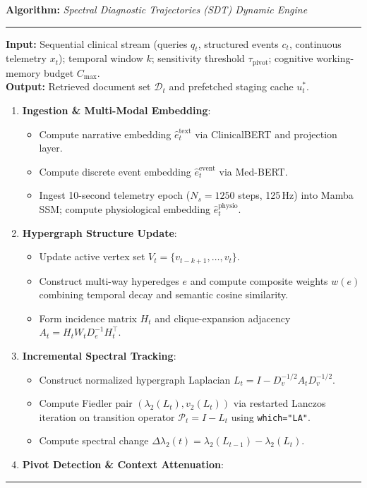 \documentclass[11pt]{article}
\newenvironment{pseudocode}[1]{%
  \begin{list}{}{\setlength{\leftmargin}{1em}\setlength{\itemsep}{1pt}}
  \item \textbf{Algorithm:} \textit{#1}
  \item \hrule \medskip
}{%
  \vspace{4pt}\hrule
  \end{list}
}
\begin{document}
\begin{pseudocode}{Spectral Diagnostic Trajectories (SDT) Dynamic Engine}
\textbf{Input:} Sequential clinical stream (queries $q_t$, structured events $c_t$, continuous telemetry $x_t$); temporal window $k$; sensitivity threshold $\tau_{\text{pivot}}$; cognitive working-memory budget $C_{\max}$.\\
\textbf{Output:} Retrieved document set $\mathcal{D}_t$ and prefetched staging cache $u_t^*$.
\begin{enumerate}
  \item \textbf{Ingestion \& Multi-Modal Embedding}:
  \begin{itemize}
    \item Compute narrative embedding $\hat{e}_t^{\text{text}}$ via ClinicalBERT and projection layer.
    \item Compute discrete event embedding $\hat{e}_t^{\text{event}}$ via Med-BERT.
    \item Ingest 10-second telemetry epoch ($N_s = 1250$ steps, 125\,Hz) into Mamba SSM; compute physiological embedding $\hat{e}_t^{\text{physio}}$.
  \end{itemize}
  \item \textbf{Hypergraph Structure Update}:
  \begin{itemize}
    \item Update active vertex set $V_t = \{v_{t-k+1}, \dots, v_t\}$.
    \item Construct multi-way hyperedges $e$ and compute composite weights $w(e)$ combining temporal decay and semantic cosine similarity.
    \item Form incidence matrix $H_t$ and clique-expansion adjacency $A_t = H_t W_t D_e^{-1} H_t^\top$.
  \end{itemize}
  \item \textbf{Incremental Spectral Tracking}:
  \begin{itemize}
    \item Construct normalized hypergraph Laplacian $L_t = I - D_v^{-1/2} A_t D_v^{-1/2}$.
    \item Compute Fiedler pair $(\lambda_2(L_t), v_2(L_t))$ via restarted Lanczos iteration on transition operator $\mathcal{P}_t = I - L_t$ using \texttt{which="LA"}.
    \item Compute spectral change $\Delta \lambda_2(t) = \lambda_2(L_{t-1}) - \lambda_2(L_t)$.
  \end{itemize}
  \item \textbf{Pivot Detection \& Context Attenuation}:

\end{enumerate}
\end{pseudocode}
\end{document}
